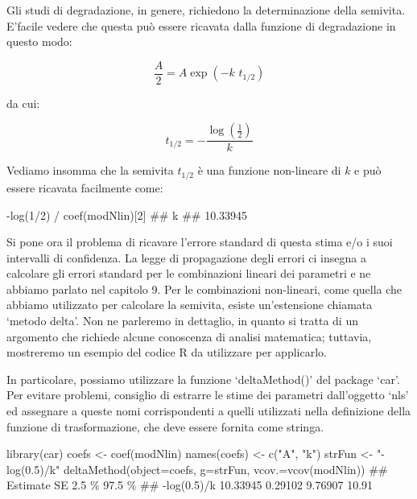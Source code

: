 \documentclass[a4paper,12pt,oneside]{book}
\newenvironment{Shaded}{\begin{snugshade}}{\end{snugshade}}
\newcommand{\DecValTok}[1]{#1}
\newcommand{\SpecialCharTok}[1]{#1}
\newcommand{\StringTok}[1]{#1}
\newcommand{\DocumentationTok}[1]{#1}
\newcommand{\OtherTok}[1]{#1}
\newcommand{\FunctionTok}[1]{#1}
\newcommand{\AttributeTok}[1]{#1}
\newcommand{\NormalTok}[1]{#1}
\begin{document}
Gli studi di degradazione, in genere, richiedono la determinazione della semivita. E'facile vedere che questa può essere ricavata dalla funzione di degradazione in questo modo:

\[\frac{A}{2} = A \exp ( - k \,\, t_{1/2})\]

da cui:

\[t_{1/2} = - \frac{ \log \left( {\frac{1}{2}} \right) }{k}\]

Vediamo insomma che la semivita \(t_{1/2}\) è una funzione non-lineare di \(k\) e può essere ricavata facilmente come:

\begin{Shaded}
\begin{Highlighting}[]
\SpecialCharTok{{-}}\FunctionTok{log}\NormalTok{(}\DecValTok{1}\SpecialCharTok{/}\DecValTok{2}\NormalTok{) }\SpecialCharTok{/} \FunctionTok{coef}\NormalTok{(modNlin)[}\DecValTok{2}\NormalTok{]}
\DocumentationTok{\#\#        k }
\DocumentationTok{\#\# 10.33945}
\end{Highlighting}
\end{Shaded}

Si pone ora il problema di ricavare l'errore standard di questa stima e/o i suoi intervalli di confidenza. La legge di propagazione degli errori ci insegna a calcolare gli errori standard per le combinazioni lineari dei parametri e ne abbiamo parlato nel capitolo 9. Per le combinazioni non-lineari, come quella che abbiamo utilizzato per calcolare la semivita, esiste un'estensione chiamata `metodo delta'. Non ne parleremo in dettaglio, in quanto si tratta di un argomento che richiede alcune conoscenza di analisi matematica; tuttavia, mostreremo un esempio del codice R da utilizzare per applicarlo.

In particolare, possiamo utilizzare la funzione `deltaMethod()' del package `car'. Per evitare problemi, consiglio di estrarre le stime dei parametri dall'oggetto `nls' ed assegnare a queste nomi corrispondenti a quelli utilizzati nella definizione della funzione di trasformazione, che deve essere fornita come stringa.

\begin{Shaded}
\begin{Highlighting}[]
\FunctionTok{library}\NormalTok{(car)}
\NormalTok{coefs }\OtherTok{\textless{}{-}} \FunctionTok{coef}\NormalTok{(modNlin) }
\FunctionTok{names}\NormalTok{(coefs) }\OtherTok{\textless{}{-}} \FunctionTok{c}\NormalTok{(}\StringTok{"A"}\NormalTok{, }\StringTok{"k"}\NormalTok{)}
\NormalTok{strFun }\OtherTok{\textless{}{-}} \StringTok{"{-}log(0.5)/k"}
\FunctionTok{deltaMethod}\NormalTok{(}\AttributeTok{object=}\NormalTok{coefs, }\AttributeTok{g=}\NormalTok{strFun, }\AttributeTok{vcov.=}\FunctionTok{vcov}\NormalTok{(modNlin))}
\DocumentationTok{\#\#             Estimate       SE    2.5 \% 97.5 \%}
\DocumentationTok{\#\# {-}log(0.5)/k 10.33945  0.29102  9.76907  10.91}
\end{Highlighting}
\end{Shaded}
\end{document}
